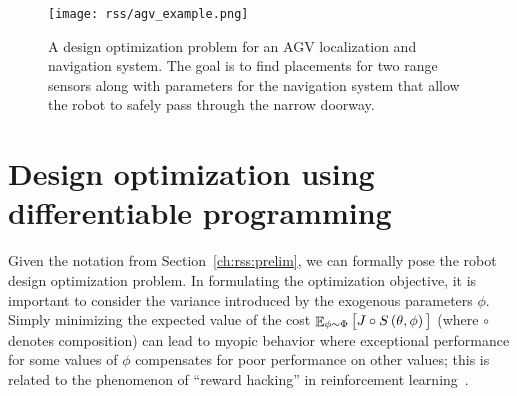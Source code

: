 \begin{figure}[tb]
    \centering
    \texttt{[image: rss/agv\_example.png]}
    \caption{A design optimization problem for an AGV localization and navigation system. The goal is to find placements for two range sensors along with parameters for the navigation system that allow the robot to safely pass through the narrow doorway.}
    \label{ch:rss:fig:agv_example}
\end{figure}

\section{Design optimization using differentiable programming}\label{ch:rss:optimization}

Given the notation from Section~\ref{ch:rss:prelim}, we can formally pose the robot design optimization problem. In formulating the optimization objective, it is important to consider the variance introduced by the exogenous parameters $\phi$. Simply minimizing the expected value of the cost $\mathop{\mathbb{E}}_{\phi \sim \Phi} \big[ J\circ S\left( \theta, \phi \right) \big]$ (where $\circ$ denotes composition) can lead to myopic behavior where exceptional performance for some values of $\phi$ compensates for poor performance on other values; this is related to the phenomenon of ``reward hacking'' in reinforcement learning~\cite{amodei2016_ai_safety}.

